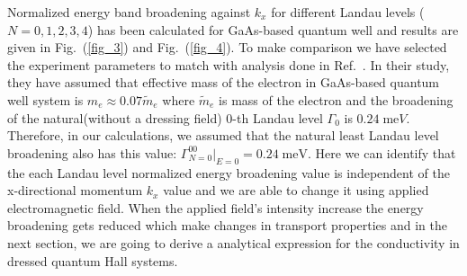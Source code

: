 Normalized energy band broadening against ${k_x}$ for different Landau levels ($N = 0,1,2,3,4$) has been calculated for GaAs-based quantum well and results are given in Fig.~(\ref{fig_3}) and Fig.~(\ref{fig_4}). To make comparison we have selected the experiment parameters to match with analysis done in Ref.~\cite{endo09}.
In their study, they have assumed that effective mass of the electron in GaAs-based quantum well system is $m_e \approx 0.07\tilde{m}_e$ where $\tilde{m}_e$ is mass of the electron \cite{endo09,winkler03,wackerl20} and the broadening of the natural(without a dressing field) $0$-th Landau level $\Gamma_0$ is $0.24\;\text{me}V$. Therefore, in our calculations, we assumed that the natural least Landau level broadening also has this value: $\Gamma^{00}_{N=0}|_{E=0} = 0.24 \;\text{meV}$.
Here we can identify that the each Landau level normalized energy broadening value is independent of the x-directional momentum $k_x$ value and we are able to change it using applied electromagnetic field. When the applied field's intensity increase the energy broadening gets reduced which make changes in transport properties and in the next section, we are going to derive a analytical expression for the conductivity in dressed quantum Hall systems.
